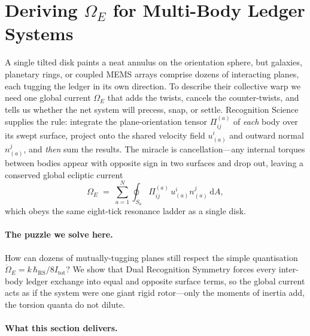 \documentclass[11pt,oneside]{book}
\begin{document}
\section{Deriving \texorpdfstring{$\Omega_{E}$}{Omega\_E} for Multi-Body Ledger Systems}
\label{sec:OmegaE-multibody-narrative}

A single tilted disk paints a neat annulus on the orientation sphere,
but galaxies, planetary rings, or coupled MEMS arrays comprise dozens
of interacting planes, each tugging the ledger in its own direction.
To describe their collective warp we need one global current
\(\Omega_{E}\) that adds the twists, cancels the counter-twists, and
tells us whether the net system will precess, snap, or settle.  
Recognition Science supplies the rule: integrate the
plane-orientation tensor \(\Pi_{ij}^{(a)}\) of \emph{each} body over
its swept surface, project onto the shared velocity field
\(u^{i}_{(a)}\) and outward normal \(n^{j}_{(a)}\), and \emph{then}
sum the results.  
The miracle is cancellation—any internal torques between bodies appear
with opposite sign in two surfaces and drop out, leaving a conserved
global ecliptic current
\[
   \Omega_{E}
   \;=\;
   \sum_{a=1}^{N}
   \oint_{S_{a}}
      \Pi_{ij}^{(a)}\,
      u^{i}_{(a)} n^{j}_{(a)}\,
      \mathrm dA,
\]
which obeys the same eight-tick resonance ladder as a single disk.

\paragraph{The puzzle we solve here.}
How can dozens of mutually-tugging planes still respect the simple
quantisation
\(\dot\Omega_{E}=k\,\hbar_{\mathrm{RS}}/8I_{\text{tot}}\)?
We show that Dual Recognition Symmetry forces every inter-body ledger
exchange into equal and opposite surface terms, so the global current
acts as if the system were one giant rigid rotor—only the moments of
inertia add, the torsion quanta do not dilute.

\paragraph{What this section delivers.}
\end{document}
